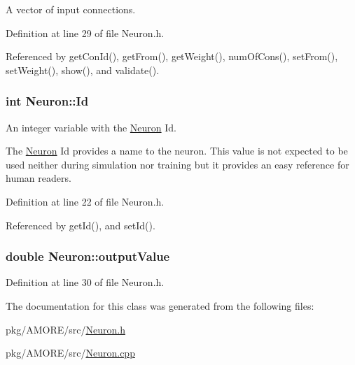 A vector of input connections. 



Definition at line 29 of file Neuron.h.



Referenced by getConId(), getFrom(), getWeight(), numOfCons(), setFrom(), setWeight(), show(), and validate().

\hypertarget{class_neuron_a72bb327a7c5c865e6748a4e074ce0680}{
\subsubsection[{Id}]{\setlength{\rightskip}{0pt plus 5cm}int {\bf Neuron::Id}}}
\label{class_neuron_a72bb327a7c5c865e6748a4e074ce0680}


An integer variable with the \hyperlink{class_neuron}{Neuron} Id. 

The \hyperlink{class_neuron}{Neuron} Id provides a name to the neuron. This value is not expected to be used neither during simulation nor training but it provides an easy reference for human readers. 

Definition at line 22 of file Neuron.h.



Referenced by getId(), and setId().

\hypertarget{class_neuron_ada029047646c36e525a6a1b77cafc03c}{
\subsubsection[{outputValue}]{\setlength{\rightskip}{0pt plus 5cm}double {\bf Neuron::outputValue}}}
\label{class_neuron_ada029047646c36e525a6a1b77cafc03c}


Definition at line 30 of file Neuron.h.



The documentation for this class was generated from the following files:\begin{DoxyCompactItemize}
\item 
pkg/AMORE/src/\hyperlink{_neuron_8h}{Neuron.h}\item 
pkg/AMORE/src/\hyperlink{_neuron_8cpp}{Neuron.cpp}\end{DoxyCompactItemize}
